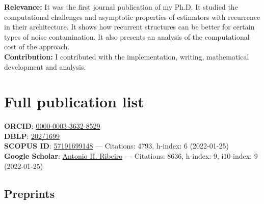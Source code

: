 \documentclass[10pt,letterpaper]{article} %
\begin{document}
    \begin{refsection}
      \nocite{ ribeiro_parallel_2018 }
      \setlength{\biblabelsep}{-15pt}
      \printbibliography[heading=none]
    \end{refsection}
    \begin{center}
    \begin{minipage}{17cm}
      \begin{footnotesize}
        \textbf{Relevance:}  It was the first journal publication of my Ph.D. It studied the computational challenges and asymptotic properties of estimators with recurrence in their architecture. It shows how recurrent structures can be better for certain types of noise contamination. It also presents an analysis of the computational cost of the approach. \\
        \textbf{Contribution: } I contributed with the implementation, writing, mathematical development and analysis.
      \end{footnotesize}
    \end{minipage}
    \end{center}





\section*{Full publication list}

\begin{tcolorbox}[width=6in, standard jigsaw, opacityback=0]
    \vspace{-4pt}
    \footnotesize
{\bf ORCID}:  \href{https://orcid.org/0000-0003-3632-8529}{0000-0003-3632-8529}\\
{\bf DBLP}: \href{https://dblp.org/pid/202/1699.html}{202/1699}\\
{\bf SCOPUS ID}: \href{https://www.scopus.com/authid/detail.uri?authorId=57191699148}{57191699148} ---
    Citations: 4793, h-index: 6 (2022-01-25) \\
{\bf Google Scholar}: \href{https://scholar.google.com.br/citations?user=5t_sZdMAAAAJ}{Antonio H. Ribeiro} ---
    Citations: 8636, h-index: 9, i10-index: 9 (2022-01-25)
\end{tcolorbox}


\subsection*{\noindent Preprints}
    \begin{refsection}
        
            \nocite{ gustafsson_artificial_2021 }
        
            \nocite{ sangha_automated_2021 }
        
       \newrefcontext[labelprefix= P ]
       \printbibliography[heading=none]
    \end{refsection}
\end{document}
